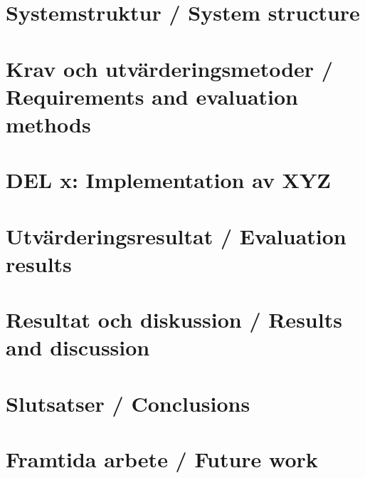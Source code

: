 \documentclass[a4paper,12pt]{article}
\begin{document}
\section{Systemstruktur / System structure}


\section{Krav och utvärderingsmetoder / Requirements and evaluation methods}\label{sec:krav}
\label{sec:krav}


\section{DEL x: Implementation av XYZ}


\section{Utvärderingsresultat / Evaluation results}


\section{Resultat och diskussion / Results and discussion}
\label{sec:resultat}


\section{Slutsatser / Conclusions}
\label{sec:slutsatser}


\section{Framtida arbete / Future work}



%



%

\newpage
\appendix %

\end{document}
